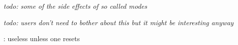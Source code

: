\stopsection

\startsection[title=Modes]


{\em todo: some of the side effects of so called modes}

\stopsection

\startsection[title=Normalization]

{\em todo: users don't need to bother about this but it might be interesting anyway}

\stopsection

\stopdocument

\everyhbox \everyvbox : useless unless one resets
\parattr
\snapshotpar
\wrapuppar


%
